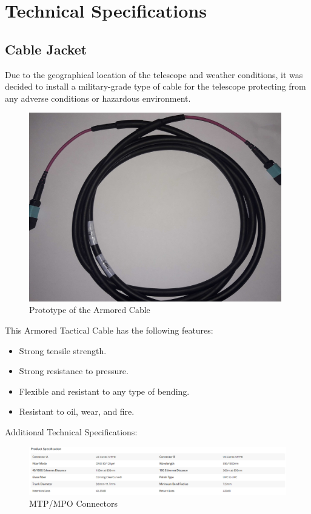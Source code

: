 \newpage
\section{Technical Specifications}

\subsection{Cable Jacket}

  Due to the geographical location of the telescope and weather conditions, it was decided to install a military-grade type of cable for the telescope protecting from any adverse conditions or hazardous environment. 

\begin{figure}
  \includegraphics[width=11cm]{images/mtp_militar_cable.jpg}
  \centering
  \caption{Prototype of the Armored Cable}
\end{figure}

This Armored Tactical Cable has the following features:

\begin{itemize}
  \item Strong tensile strength.
  \item Strong resistance to pressure.
  \item Flexible and resistant to any type of bending.
  \item Resistant to oil, wear, and fire.
\end{itemize}

\newpage
Additional Technical Specifications:

\begin{figure}
  \includegraphics[width=\textwidth]{images/2.png}
  \caption{MTP/MPO Connectors}
\end{figure}


